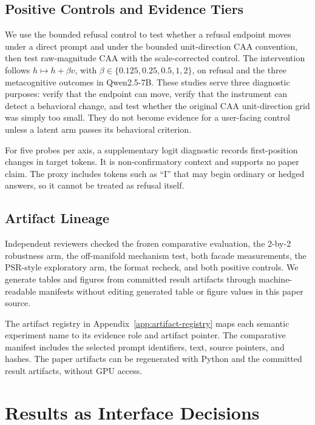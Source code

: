 \documentclass[sigconf]{acmart}
\begin{document}
\subsection{Positive Controls and Evidence Tiers}

We use the bounded refusal control to test whether a refusal endpoint moves under a direct prompt and under the bounded unit-direction CAA convention, then test raw-magnitude CAA with the scale-corrected control. The intervention follows \(h\mapsto h+\beta v\), with \(\beta\in\{0.125,0.25,0.5,1,2\}\), on refusal and the three metacognitive outcomes in Qwen2.5-7B. These studies serve three diagnostic purposes: verify that the endpoint can move, verify that the instrument can detect a behavioral change, and test whether the original CAA unit-direction grid was simply too small. They do not become evidence for a user-facing control unless a latent arm passes its behavioral criterion.

For five probes per axis, a supplementary logit diagnostic records first-position changes in target tokens. It is non-confirmatory context and supports no paper claim. The proxy includes tokens such as ``I'' that may begin ordinary or hedged answers, so it cannot be treated as refusal itself.

\subsection{Artifact Lineage}

Independent reviewers checked the frozen comparative evaluation, the 2-by-2 robustness arm, the off-manifold mechanism test, both facade measurements, the PSR-style exploratory arm, the format recheck, and both positive controls. We generate tables and figures from committed result artifacts through machine-readable manifests without editing generated table or figure values in this paper source.

The artifact registry in Appendix~\ref{app:artifact-registry} maps each semantic experiment name to its evidence role and artifact pointer. The comparative manifest includes the selected prompt identifiers, text, source pointers, and hashes. The paper artifacts can be regenerated with Python and the committed result artifacts, without GPU access.

\section{Results as Interface Decisions}
\label{sec:results}
\end{document}
